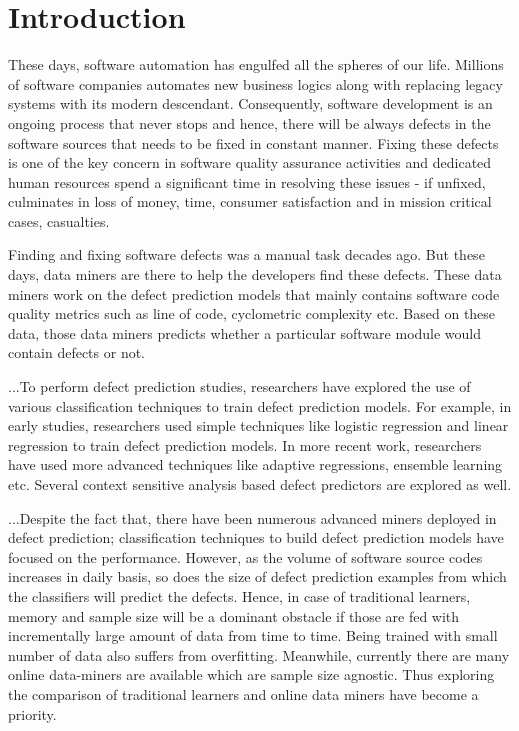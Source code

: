 \documentclass[sigplan]{acmart}\settopmatter{printfolios=true,printccs=false,printacmref=false}
\begin{document}
\section{Introduction}
These days, software automation has engulfed all the spheres of our life. Millions of software companies automates new business logics along with replacing legacy systems with its modern descendant. Consequently, software development is an ongoing process that never stops and hence, there will be always defects in the software sources that needs to be fixed in constant manner. Fixing these defects is one of the key concern in software quality assurance activities and dedicated human resources spend a significant time in resolving these issues - if unfixed, culminates in loss of money, time, consumer satisfaction and in mission critical cases, casualties.  

Finding and fixing software defects was a manual task decades ago. But these days, data miners are there to help the developers find these defects. These data miners work on the defect prediction models that mainly contains software code quality metrics such as line of code, cyclometric complexity etc. Based on these data, those data miners predicts whether a particular software module would contain defects or not.  

...To perform defect prediction studies, researchers have explored the use of various classification techniques to train defect prediction models. For example, in early studies, researchers used simple techniques like logistic regression and linear regression to train defect prediction models. In more recent work, researchers have used more advanced techniques like adaptive regressions, ensemble learning etc. Several context sensitive analysis based defect predictors are explored as well.  

...Despite the fact that, there have been numerous advanced miners deployed in defect prediction; classification techniques to build defect prediction models have focused on the performance. However, as the volume of software source codes increases in daily basis, so does the size of defect prediction examples from which the classifiers will predict the defects. Hence, in case of traditional learners, memory and sample size will be a dominant obstacle if those are fed with incrementally large amount of data from time to time. Being trained with small number of data also suffers from overfitting. Meanwhile, currently there are many online data-miners are available which are sample size agnostic. Thus exploring the comparison of traditional learners and online data miners have become a priority.  
\end{document}
